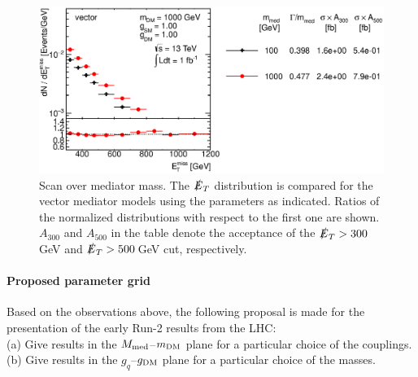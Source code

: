 \begin{figure}
\centering
\includegraphics[width=0.9\linewidth]{figures/monojet/scan_mMed_V_1000.eps}
\caption{Scan over mediator mass. The $\slashed{E}_T$ distribution is compared for the vector mediator models using the parameters as indicated. Ratios of the normalized distributions with respect to the first one are shown. $A_{300}$ and $A_{500}$ in the table denote the acceptance of the $\slashed{E}_T>300$\,GeV and $\slashed{E}_T>500$\,GeV cut, respectively.}
\label{fig:monojet_scan_V_mMed1000}
\end{figure}


\paragraph{Proposed parameter grid}

Based on the observations above, the following proposal is made for the presentation of the early Run-2 results from the LHC:\\
(a) Give results in the $M_{\rm{med}}$--$m_{\rm{DM}}$ plane for a particular choice of the couplings.\\
(b) Give results in the $g_q$--$g_{\rm{DM}}$ plane for a particular choice of the masses.


